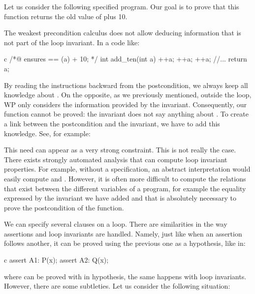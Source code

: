 

Let us consider the following specified program. Our goal is to prove
that this function returns the old value of  plus 10.






The weakest precondition calculus does not allow deducing information
that is not part of the loop invariant. In a code like:



\begin{CodeBlock}{c}
/*@
    ensures \result == \old(a) + 10;
*/
int add_ten(int a){
    ++a;
    ++a;
    ++a;
    //...
    return a;
}
\end{CodeBlock}


By reading the instructions backward
from the postcondition, we always keep all knowledge about . On
the opposite, as we previously mentioned, outside the loop, WP only
considers the information provided by the invariant. Consequently, our
 function cannot be proved: the invariant does not say anything
about . To create a link between the postcondition and the
invariant, we have to add this knowledge. See, for example:






\begin{Information}
  This need can appear as a very strong constraint. This is not really the
  case. There exists strongly automated analysis that can compute loop
  invariant properties. For example, without a specification, an abstract
  interpretation would easily compute 
  and .
  However, it is often more difficult to compute the relations
  that exist between the different variables of a program, for
  example the equality expressed by the invariant we have
  added and that is absolutely necessary to prove the postcondition of the
  function.
\end{Information}




We can specify several  clauses on a loop. There are
similarities in the way assertions and loop invariants are handled. Namely, just
like when an assertion follows another, it can be proved using the previous one
as a hypothesis, like in:
\begin{CodeBlock}{c}
assert A1: P(x);
assert A2: Q(x);
\end{CodeBlock}
where  can be proved with  in hypothesis, the same
happens with loop invariants. However, there are some subtleties. Let us
consider the following situation:


